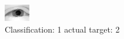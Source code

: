 \begin{figure}[h!]
\begin{center}
\includegraphics[width=0.60\columnwidth]{figures/ID2293_class_1_target_2.png}
\end{center}
\caption{ Classification: 1 actual target: 2}
\label{fig:ID2293_class_1_target_2}
\end{figure}
